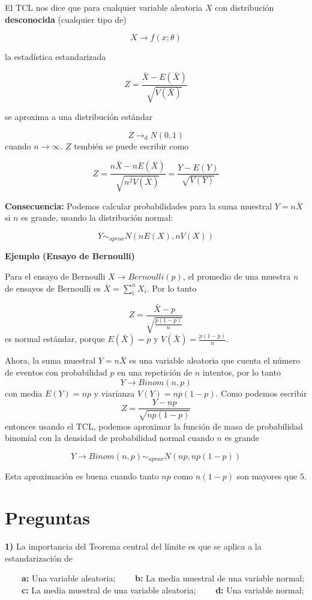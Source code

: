 \documentclass[
]{book}
\begin{document}
El TCL nos dice que para cualquier variable aleatoria \(X\) con distribución \textbf{desconocida} (cualquier tipo de)

\[X \rightarrow f(x; \theta)\]

la estadística estandarizada

\[Z=\frac{\bar{X}-E(\bar{X})}{\sqrt{V(\bar{X})}}\]

se aproxima a una distribución estándar

\[Z \rightarrow_d N(0,1)\] cuando \(n\rightarrow \infty\). \(Z\) tembién se puede escribir como

\[Z=\frac{n\bar{X}-nE(\bar{X})}{\sqrt{n^2V(\bar{X})}}=\frac{Y-E(Y)}{\sqrt{V(Y)}}\]

\textbf{Consecuencia:} Podemos calcular probabilidades para la suma muestral \(Y=n\bar{X}\) si \(n\) es grande, usando la distribución normal:

\[Y \sim_{aprox}  N(nE(X), nV(X))\]

\textbf{Ejemplo (Ensayo de Bernoulli)}

Para el ensayo de Bernoulli \(X \rightarrow Bernoulli(p)\), el promedio de una muestra \(n\) de ensayos de Bernoulli es \(\bar{X}=\sum_i^n X_i\). Por lo tanto

\[Z=\frac{\bar{X}-p}{\sqrt{\frac{p(1-p)}{n}}}\]
es normal estándar, porque \(E(\bar{X})=p\) y \(V(\bar{X})=\frac{p(1-p)}{n}\).

Ahora, la suma muestral \(Y=n\bar{X}\) es una variable aleatoria que cuenta el número de eventos con probabilidad \(p\) en una repetición de \(n\) intentos, por lo tanto
\[Y \rightarrow Binom(n, p)\]
con media \(E(Y)=np\) y viarianza \(V(Y)=np(1-p)\). Como podemos escribir
\[Z=\frac{Y-np}{\sqrt{np(1-p)}}\]
entonces usando el TCL, podemos aproximar la función de masa de probabilidad binomial con la densidad de probabilidad normal cuando \(n\) es grande

\[Y \rightarrow Binom(n, p) \sim_{aprox} N(np, np(1-p))\]

Esta aproximación es buena cuando tanto \(np\) como \(n(1-p)\) son mayores que \(5\).

\hypertarget{preguntas-8}{%
\section{Preguntas}\label{preguntas-8}}

\textbf{1)} La importancia del Teorema central del límite es que se aplica a la estandarización de

\textbf{\(\qquad\)a:} Una variable aleatoria;
\textbf{\(\qquad\)b:} La media muestral de una variable normal;
\textbf{\(\qquad\)c:} La media muestral de una variable aleatoria;
\textbf{\(\qquad\)d:} Una variable normal;
\end{document}
